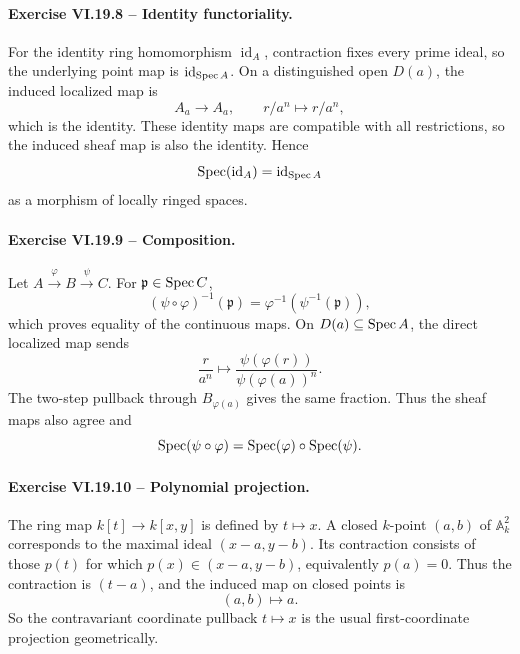 \paragraph{Exercise VI.19.8 -- Identity functoriality.}
\begin{solution}
For the identity ring homomorphism \(\operatorname{id}_A\), contraction fixes every prime ideal, so the underlying point map is \(\operatorname{id}_{\operatorname{Spec} A}\).  On a distinguished open \(D(a)\), the induced localized map is
\[
A_a\longrightarrow A_a,\qquad r/a^n\longmapsto r/a^n,
\]
which is the identity.  These identity maps are compatible with all restrictions, so the induced sheaf map is also the identity.  Hence
\[
\operatorname{Spec}(\operatorname{id}_A)=\operatorname{id}_{\operatorname{Spec} A}
\]
as a morphism of locally ringed spaces.
\end{solution}

\paragraph{Exercise VI.19.9 -- Composition.}
\begin{solution}
Let \(A\xrightarrow{\varphi}B\xrightarrow{\psi}C\).  For \(\mathfrak p\in\operatorname{Spec} C\),
\[
(\psi\circ\varphi)^{-1}(\mathfrak p)
=\varphi^{-1}(\psi^{-1}(\mathfrak p)),
\]
which proves equality of the continuous maps.  On \(D(a)\subseteq\operatorname{Spec} A\), the direct localized map sends
\[
\frac r{a^n}\longmapsto
\frac{\psi(\varphi(r))}{\psi(\varphi(a))^n}.
\]
The two-step pullback through \(B_{\varphi(a)}\) gives the same fraction.  Thus the sheaf maps also agree and
\[
\operatorname{Spec}(\psi\circ\varphi)=\operatorname{Spec}(\varphi)\circ\operatorname{Spec}(\psi).
\]
\end{solution}

\paragraph{Exercise VI.19.10 -- Polynomial projection.}
\begin{solution}
The ring map \(k[t]\to k[x,y]\) is defined by \(t\mapsto x\).  A closed \(k\)-point \((a,b)\) of \(\mathbb A_k^2\) corresponds to the maximal ideal \((x-a,y-b)\).  Its contraction consists of those \(p(t)\) for which \(p(x)\in(x-a,y-b)\), equivalently \(p(a)=0\).  Thus the contraction is \((t-a)\), and the induced map on closed points is
\[
(a,b)\longmapsto a.
\]
So the contravariant coordinate pullback \(t\mapsto x\) is the usual first-coordinate projection geometrically.
\end{solution}

